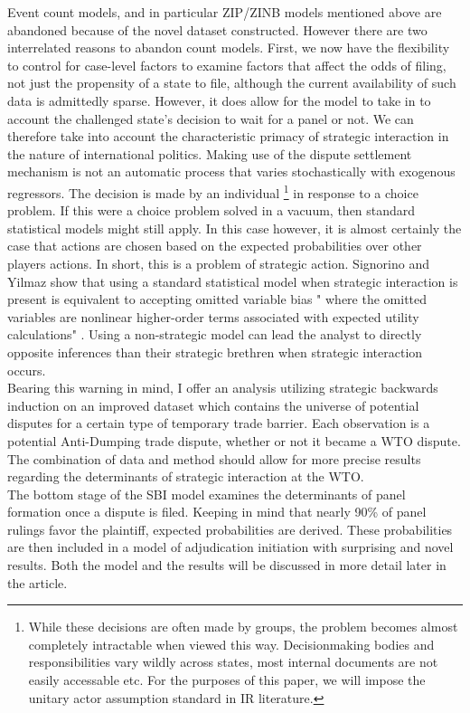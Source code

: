 \documentclass[]{article}
\begin{document}
Event count models, and in particular ZIP/ZINB models mentioned above are abandoned because of the novel dataset constructed. However there are two interrelated reasons to abandon count models. First, we now have the flexibility to control for case-level factors to examine factors that affect the odds of filing, not just the propensity of a state to file, although the current availability of such data is admittedly sparse. However, it does allow for the model to take in to account the challenged state's decision to wait for a panel or not. We can therefore take into account the characteristic primacy of strategic interaction in the nature of international politics. Making use of the dispute settlement mechanism is not an automatic process that varies stochastically with exogenous regressors. The decision is made by an individual \footnote{While these decisions are often made by groups, the problem becomes almost completely intractable when viewed this way. Decisionmaking bodies and responsibilities vary wildly across states, most internal documents are not easily accessable etc. For the purposes of this paper, we will impose the unitary actor assumption standard in IR literature.}  in response to a choice problem. If this were a choice problem solved in a vacuum, then standard statistical models might still apply. In this case however, it is almost certainly the case that actions are chosen based on the expected probabilities over other players actions. In short, this is a problem of strategic action. Signorino and Yilmaz show that using a standard statistical model when strategic interaction is present is equivalent to accepting omitted variable bias " where the omitted variables are nonlinear higher-order terms associated with expected utility calculations" \cite{SY2003}. Using a non-strategic model can lead the analyst to directly opposite inferences than their strategic brethren when strategic interaction occurs. \\

Bearing this warning in mind, I offer an analysis utilizing strategic backwards induction on an improved dataset which contains the universe of potential disputes for a certain type of temporary trade barrier. Each observation is a potential Anti-Dumping trade dispute, whether or not it became a WTO dispute. The combination of data and method should allow for more precise results regarding the determinants of strategic interaction at the WTO. \\

 The bottom stage of the SBI model examines the determinants of panel formation once a dispute is filed. Keeping in mind that nearly 90\% of panel rulings favor the plaintiff, expected probabilities are derived. These probabilities are then included in a model of adjudication initiation with surprising and novel results. Both the model and the results will be discussed in more detail later in the article. 
\end{document}
